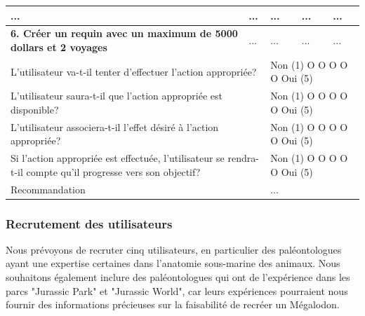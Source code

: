 \documentclass{article}
\begin{document}
\begin{table}[h]
\begin{tabular}{|p{6cm}|p{1.5cm}|p{1.5cm}|p{2.5cm}|p{3.5cm}|}
		\textbf{...}                                                                                                                              & ...                                                   & ...              & ...                                      & ...                   \\ \hline
		\textbf{6. Créer un requin avec un maximum de 5000 dollars et 2 voyages}                                                                  & ...                                                   & ...              & ...                                      & ...                   \\ \hline
		\multicolumn{2}{|p{7.5cm}|}{L’utilisateur va-t-il tenter d’effectuer l’action appropriée?}                                                & \multicolumn{3}{p{7.5cm}|}{Non (1) O O O O O Oui (5)}                                                                                       \\ \hline
		\multicolumn{2}{|p{7.5cm}|}{L’utilisateur saura-t-il que l’action appropriée est disponible?}                                             & \multicolumn{3}{p{7.5cm}|}{Non (1) O O O O O Oui (5)}                                                                                       \\ \hline
		\multicolumn{2}{|p{7.5cm}|}{L’utilisateur associera-t-il l’effet désiré à l’action appropriée?}                                           & \multicolumn{3}{p{7.5cm}|}{Non (1) O O O O O Oui (5)}                                                                                       \\ \hline
		\multicolumn{2}{|p{7.5cm}|}{Si l’action appropriée est effectuée, l’utilisateur se rendra-t-il compte qu’il progresse vers son objectif?} & \multicolumn{3}{p{7.5cm}|}{Non (1) O O O O O Oui (5)}                                                                                       \\ \hline
		\multicolumn{2}{|p{7.5cm}|}{Recommandation}                                                                                               & \multicolumn{3}{p{7.5cm}|}{...}                                                                                                             \\ \hline
	\end{tabular}
\end{table}

\clearpage
\subsubsection{Recrutement des utilisateurs}
Nous prévoyons de recruter cinq utilisateurs, en particulier des paléontologues ayant une expertise certaines dans l'anatomie sous-marine des animaux. Nous souhaitons également inclure des paléontologues qui ont de l'expérience dans les parcs "Jurassic Park" et "Jurassic World", car leurs expériences pourraient nous fournir des informations précieuses sur la faisabilité de recréer un Mégalodon.
\end{document}
